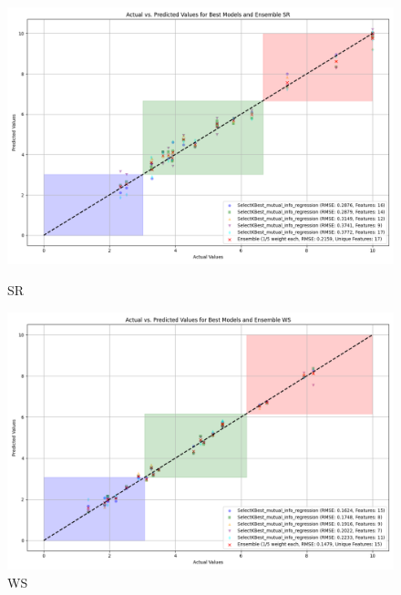 \begin{figure}[H]
    \centering
    \begin{minipage}{0.45\textwidth}
        \centering
        \includegraphics[width=\linewidth]{reg_section_specific/images_reg_featred_ensemble/actual_vs_predicted_best_feature_selection_and_ensemble_SR.png}
        \caption{SR}
        \label{fig_reg_spec:sr_reg_featred_best_ensemble}
    \end{minipage}\hfill
    \begin{minipage}{0.45\textwidth}
        \centering
        \includegraphics[width=\linewidth]{reg_section_specific/images_reg_featred_ensemble/actual_vs_predicted_best_feature_selection_and_ensemble_WS.png}
        \caption{WS}
        \label{fig_reg_spec:ws_reg_featred_best_ensemble}
    \end{minipage}
\end{figure}

